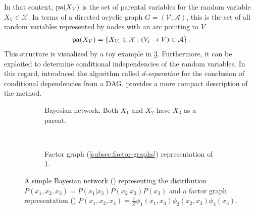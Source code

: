 In that context, $\pa(X_V)$ is the set of parental variables for the random variable
$X_V\in\mathcal{X}$. In terms of a directed acyclic graph
$G=\left(\mathcal{V},\mathcal{A}\right)$, this is the set of all random variables represented by
nodes with an arc pointing to $V$
\begin{align}
    \label{gm-bayesian-parental}
    \pa(X_V) = \left\{X_{V_i} \in \mathcal{X} : (V_i \to V) \in \mathcal{A} \right\}.
\end{align}
This structure is visualized by a toy example in \cref{fig:gm-bayesian-net}.  Furthermore, it can be
exploited to determine conditional independencies of the random variables. In this regard,
\citet{verma_88_causal} introduced the algorithm called \emph{d-separation} for the conclusion of
conditional dependencies from a DAG. \citet[43]{barber_12_bayesian} provides a more compact
description of the method.
\begin{figure}
    \centering
    \begin{subfigure}[t]{0.48\textwidth}
        \centering
        \begin{tikzpicture}[thick, on grid, every node/.style={font=\small, scale=1.5}, baseline=(v.south)]
            
        \end{tikzpicture}
        \caption{Bayesian network: Both $X_1$ and $X_2$ have $X_3$ as a parent.}
        \label{subfig:gm-bayesian-net-example}
    \end{subfigure}
    ~
    \begin{subfigure}[t]{0.48\textwidth}
        \centering
        \begin{tikzpicture}[thick, on grid, every node/.style={font=\small, scale=1.5}, baseline=(v.south)]
            
        \end{tikzpicture}
        \caption{Factor graph (\cref{subsec:factor-graphs}) representation of
            \cref{subfig:gm-bayesian-net-example}.}
        \label{subfig:gm-bayesian-net-fg}
    \end{subfigure}
    \caption[A simple Bayesian network]{A simple Bayesian network
        () representing the distribution $P(x_1,x_2,x_3) =
        P(x_1|x_3)P(x_2|x_3)P(x_3)$ and a factor graph representation () $P(x_1, x_2, x_3) =
        \frac{1}{Z}\phi_1(x_1,x_3)\phi_2(x_2,x_3)\phi_3(x_3)$.}
    \label{fig:gm-bayesian-net}
\end{figure}



